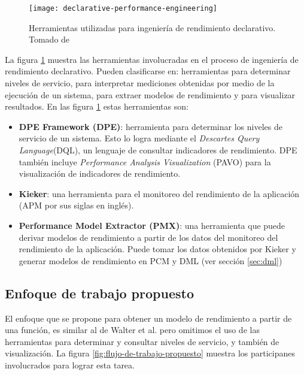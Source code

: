 \begin{figure}[h]
  \centering
  \texttt{[image: declarative-performance-engineering]}
  \caption[Herramientas utilizadas para ingeniería de rendimiento declarativo]{Herramientas utilizadas para ingeniería de rendimiento declarativo. Tomado de \cite{Walter:2018:TDP:3185768.3185777}}
  \label{fig:declarative-performance-engineering}
\end{figure}

La figura \ref{fig:declarative-performance-engineering} muestra las herramientas involucradas en el proceso de ingeniería de rendimiento declarativo. Pueden clasificarse en: herramientas para determinar niveles de servicio, para interpretar mediciones obtenidas por medio de la ejecución de un sistema, para extraer modelos de rendimiento y para visualizar resultados. En las figura \ref{fig:declarative-performance-engineering} estas herramientas son:
\begin{itemize}
    \item \textbf{DPE Framework (DPE)}: herramienta para determinar los niveles de servicio de un sistema. Esto lo logra mediante el \emph{Descartes Query Language}(DQL), un lenguaje de consultar indicadores de rendimiento. DPE también incluye \emph{Performance Analysis Visualization} (PAVO) para la visualización de indicadores de rendimiento.
    \item \textbf{Kieker}: una herramienta para el monitoreo del rendimiento de la aplicación (APM por sus siglas en inglés). 
    \item \textbf{Performance Model Extractor (PMX)}: una herramienta que puede derivar modelos de rendimiento a partir de los datos del monitoreo del rendimiento de la aplicación. Puede tomar los datos obtenidos por Kieker y generar modelos de rendimiento en PCM y DML (ver sección \ref{sec:dml})
\end{itemize}

\subsection{Enfoque de trabajo propuesto}
El enfoque que se propone para obtener un modelo de rendimiento a partir de una función, es similar al de Walter et al. \cite{Walter:2018:TDP:3185768.3185777} pero omitimos el uso de las herramientas para determinar y consultar niveles de servicio, y también de visualización. La figura \ref{fig:flujo-de-trabajo-propuesto} muestra los participanes involucrados para lograr esta tarea. 

